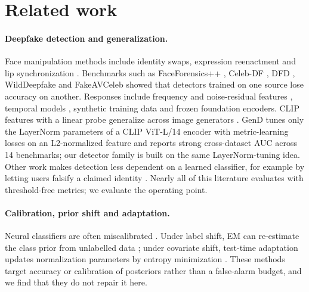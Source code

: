 \section{Related work}
\label{sec:related}

\paragraph{Deepfake detection and generalization.}
Face manipulation methods include identity swaps, expression reenactment and lip synchronization \citep{tolosana2020deepfakes}. Benchmarks such as FaceForensics++ \citep{rossler2019faceforensics}, Celeb-DF \citep{li2020celeb}, DFD \citep{dufour2019deepfakedetection}, WildDeepfake \citep{zi2020wilddeepfake} and FakeAVCeleb \citep{khalid2021fakeavceleb} showed that detectors trained on one source lose accuracy on another. Responses include frequency and noise-residual features \citep{fridrich2012rich,frank2020leveraging}, temporal models \citep{guera2018deepfake,zheng2021exploring}, synthetic training data \citep{shiohara2022detecting} and frozen foundation encoders. CLIP \citep{radford2021learning} features with a linear probe generalize across image generators \citep{ojha2023towards}. GenD \citep{yermakov2026gend} tunes only the LayerNorm parameters of a CLIP ViT-L/14 encoder with metric-learning losses on an L2-normalized feature and reports strong cross-dataset AUC across 14 benchmarks; our detector family is built on the same LayerNorm-tuning idea. Other work makes detection less dependent on a learned classifier, for example by letting users falsify a claimed identity \citep{reiss2025falsify}. Nearly all of this literature evaluates with threshold-free metrics; we evaluate the operating point.

\paragraph{Calibration, prior shift and adaptation.}
Neural classifiers are often miscalibrated \citep{guo2017calibration}. Under label shift, EM can re-estimate the class prior from unlabelled data \citep{saerens2002adjusting}; under covariate shift, test-time adaptation updates normalization parameters by entropy minimization \citep{wang2021tent}. These methods target accuracy or calibration of posteriors rather than a false-alarm budget, and we find that they do not repair it here.

